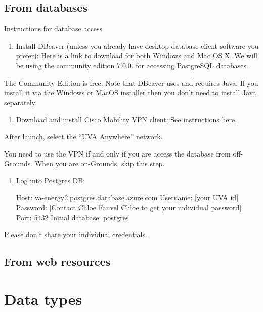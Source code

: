 \documentclass[
]{book}
\providecommand{\tightlist}{%
  \setlength{\itemsep}{0pt}\setlength{\parskip}{0pt}}
\begin{document}
\hypertarget{from-databases}{%
\subsection{From databases}\label{from-databases}}

Instructions for database access

\begin{enumerate}
\def\labelenumi{(\arabic{enumi})}
\tightlist
\item
  Install DBeaver (unless you already have desktop database client software you prefer): Here is a link to download for both Windows and Mac OS X. We will be using the community edition 7.0.0. for accessing PostgreSQL databases.
\end{enumerate}

The Community Edition is free. Note that DBeaver uses and requires Java. If you install it via the Windows or MacOS installer then you don't need to install Java separately.

\begin{enumerate}
\def\labelenumi{(\arabic{enumi})}
\setcounter{enumi}{1}
\tightlist
\item
  Download and install Cisco Mobility VPN client: See instructions here.
\end{enumerate}

After launch, select the ``UVA Anywhere'' network.

You need to use the VPN if and only if you are access the database from off-Grounds. When you are on-Grounds, skip this step.

\begin{enumerate}
\def\labelenumi{(\arabic{enumi})}
\setcounter{enumi}{2}
\item
  Log into Postgres DB:

  Host: va-energy2.postgres.database.azure.com
  Username: {[}your UVA id{]}\citet{va-energy2}
  Password: {[}Contact Chloe Fauvel Chloe to get your individual password{]}
  Port: 5432
  Initial database: postgres
\end{enumerate}

Please don't share your individual credentials.

\hypertarget{from-web-resources}{%
\subsection{From web resources}\label{from-web-resources}}

\hypertarget{data-types}{%
\section{Data types}\label{data-types}}
\end{document}
